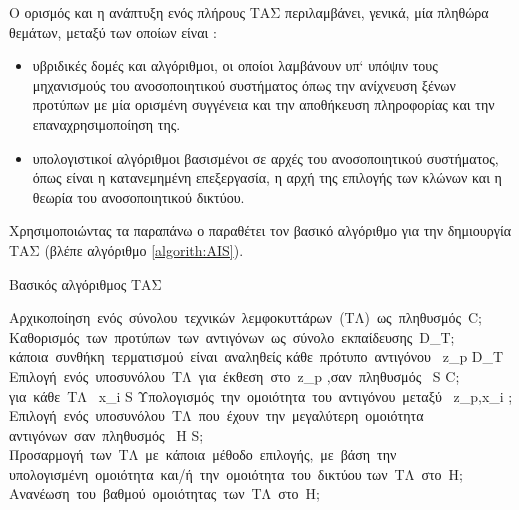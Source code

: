 \documentclass{assignment}
\begin{document}
Ο ορισμός και η ανάπτυξη ενός πλήρους ΤΑΣ περιλαμβάνει, γενικά, μία πληθώρα θεμάτων, μεταξύ των οποίων είναι \cite{engelbrecht,karakasis_thesis}:

\begin{itemize}
\item υβριδικές δομές και αλγόριθμοι, οι οποίοι λαμβάνουν υπ` υπόψιν τους μηχανισμούς του ανοσοποιητικού συστήματος όπως την ανίχνευση ξένων προτύπων με μία ορισμένη συγγένεια και την αποθήκευση πληροφορίας και την επαναχρησιμοποίηση της.
\item υπολογιστικοί αλγόριθμοι βασισμένοι σε αρχές του ανοσοποιητικού συστήματος, όπως είναι η κατανεμημένη επεξεργασία, η αρχή της επιλογής των κλώνων και η θεωρία του ανοσοποιητικού δικτύου.
\end{itemize}


Χρησιμοποιώντας τα παραπάνω ο \citeauthor{engelbrecht} παραθέτει τον βασικό αλγόριθμο για την δημιουργία ΤΑΣ (βλέπε αλγόριθμο \ref{algorith:AIS}). 
\begin{algorithm}                        %
\caption{Βασικός αλγόριθμος ΤΑΣ \cite{engelbrecht}}          %
\label{algorith:AIS}                      %
\begin{program}
\mbox{Αρχικοποίηση ενός σύνολου τεχνικών λεμφοκυττάρων (ΤΛ) ως πληθυσμός }C;
\mbox{Καθορισμός των προτύπων των αντιγόνων ως σύνολο εκπαίδευσης }D_T;
\WHILE \mbox{κάποια συνθήκη τερματισμού είναι αναληθείς} \DO 
  \FOR \mbox{κάθε πρότυπο αντιγόνου } z_p \in D_T \DO
    \mbox{Επιλογή ενός υποσυνόλου ΤΛ για έκθεση στο }z_p \mbox{,σαν πληθυσμός } S \leq C;
    \FOR \mbox{για κάθε ΤΛ } x_i \in S \DO
          \mbox{Υπολογισμός την ομοιότητα του αντιγόνου μεταξύ } z_p,x_i ;
    \END
    \mbox{Επιλογή ενός υποσυνόλου ΤΛ που έχουν την μεγαλύτερη ομοιότητα }
    \mbox{αντιγόνων σαν πληθυσμός } H \leq S;
    \mbox{Προσαρμογή των ΤΛ με κάποια μέθοδο επιλογής, με βάση την}
    \mbox{υπολογισμένη ομοιότητα και/ή την ομοιότητα του δικτύου}
    \mbox{των ΤΛ στο }H;
    \mbox{Ανανέωση του βαθμού ομοιότητας των ΤΛ στο }H;
  \END
\END
\end{program}
\end{algorithm}
\end{document}
